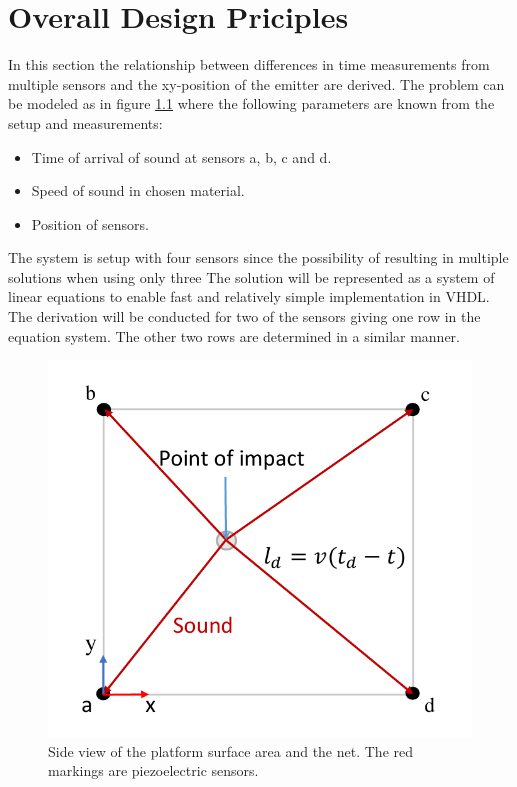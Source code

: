 \chapter{Overall Design Priciples} %
\label{cha:overall_design_priciples}
	In this section the relationship between differences in time measurements from multiple sensors and the xy-position of the emitter are derived.	
	The problem can be modeled as in figure \ref{fig:tdoa_model} where the following parameters are known from the setup and measurements:
	\begin{itemize}
		\item Time of arrival of sound at sensors a, b, c and d.
		\item Speed of sound in chosen material.
		\item Position of sensors.
	\end{itemize}
	The system is setup with four sensors since the possibility of resulting in multiple solutions when using only three \cite{tdoa_book}
	The solution will be represented as a system of linear equations to enable fast and relatively simple implementation in VHDL.
	The derivation will be conducted for two of the sensors giving one row in the equation system. The other two rows are determined in a similar manner.
	\begin{figure}[htb]
		\centering
		\includegraphics[width=.6\textwidth]{figures/tdoa_model}
		\caption{Side view of the platform surface area and the net. The red markings are piezoelectric sensors.}
		\label{fig:tdoa_model}
	\end{figure}

